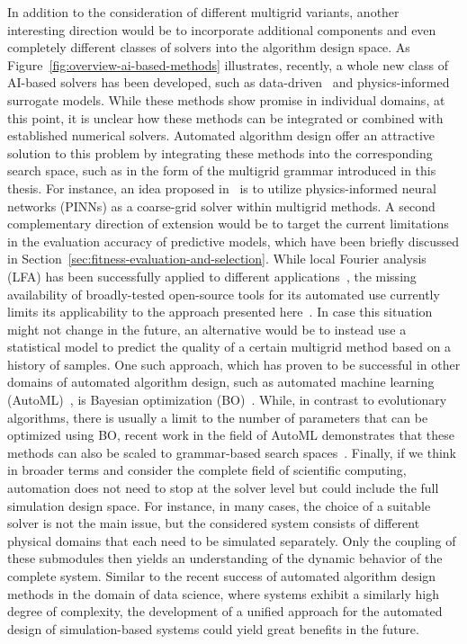 In addition to the consideration of different multigrid variants, another interesting direction would be to incorporate additional components and even completely different classes of solvers into the algorithm design space.
As Figure~\ref{fig:overview-ai-based-methods} illustrates, recently, a whole new class of AI-based solvers has been developed, such as data-driven~\cite{thuerey2020deep} and physics-informed~\cite{karniadakis2021physics} surrogate models.
While these methods show promise in individual domains, at this point, it is unclear how these methods can be integrated or combined with established numerical solvers.
Automated algorithm design offer an attractive solution to this problem by integrating these methods into the corresponding search space, such as in the form of the multigrid grammar introduced in this thesis.
For instance, an idea proposed in~\cite{markidis2021old} is to utilize physics-informed neural networks (PINNs) as a coarse-grid solver within multigrid methods.
A second complementary direction of extension would be to target the current limitations in the evaluation accuracy of predictive models, which have been briefly discussed in Section~\ref{sec:fitness-evaluation-and-selection}.
While local Fourier analysis (LFA) has been successfully applied to different applications~\cite{rodrigo2017validity}, the missing availability of broadly-tested open-source tools for its automated use currently limits its applicability to the approach presented here~\cite{schmitt2020constructing}.
In case this situation might not change in the future, an alternative would be to instead use a statistical model to predict the quality of a certain multigrid method based on a history of samples.
One such approach, which has proven to be successful in other domains of automated algorithm design, such as automated machine learning (AutoML)~\cite{kotthoff2019auto,snoek2012practical}, is Bayesian optimization (BO)~\cite{frazier2018tutorial}.
While, in contrast to evolutionary algorithms, there is usually a limit to the number of parameters that can be optimized using BO, recent work in the field of AutoML demonstrates that these methods can also be scaled to grammar-based search spaces~\cite{schrodi2022towards}.
Finally, if we think in broader terms and consider the complete field of scientific computing, automation does not need to stop at the solver level but could include the full simulation design space.
For instance, in many cases, the choice of a suitable solver is not the main issue, but the considered system consists of different physical domains that each need to be simulated separately.
Only the coupling of these submodules then yields an understanding of the dynamic behavior of the complete system.
Similar to the recent success of automated algorithm design methods in the domain of data science, where systems exhibit a similarly high degree of complexity, the development of a unified approach for the automated design of simulation-based systems could yield great benefits in the future.